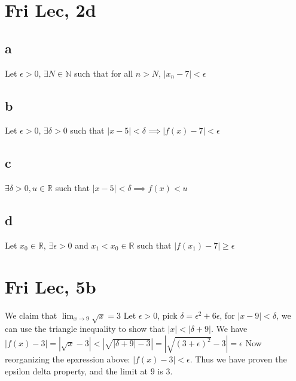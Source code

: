 \documentclass[12pt]{article}
\newcommand{\N}{\mathbb{N}}
\newcommand{\R}{\mathbb{R}}
\begin{document}
\section{Fri Lec, 2d}
\subsection{a}
Let $\epsilon>0$, $\exists N \in \N$ such that for all $n > N$, $|x_n-7|<\epsilon$

\subsection{b}
Let $\epsilon > 0$, $\exists \delta > 0$ such that $|x-5|<\delta \implies |f(x)-7|<\epsilon$

\subsection{c}
$\exists \delta > 0, u \in \R$ such that $|x-5|< \delta \implies f(x)<u$

\subsection{d}
Let $x_0 \in \R$, $\exists \epsilon > 0$ and $x_1<x_0 \in \R$ such that $|f(x_1)-7| \geq \epsilon$


\section{Fri Lec, 5b}
We claim that $\lim_{x \to 9}\sqrt{x}=3$
\newline
Let $\epsilon > 0$, pick $\delta = \epsilon ^ 2 + 6\epsilon$, for $|x-9|<\delta$, we can use the triangle inequality to show that $|x|<|\delta + 9|$. We have $|f(x)-3| = |\sqrt{x}-3| < |\sqrt{|\delta + 9|-3}| = |\sqrt{(3+\epsilon)^2}-3|= \epsilon$
\newline
Now reorganizing the epxression above: $|f(x)-3| < \epsilon$. Thus we have proven the epsilon delta property, and the limit at $9$ is $3$.
\end{document}
